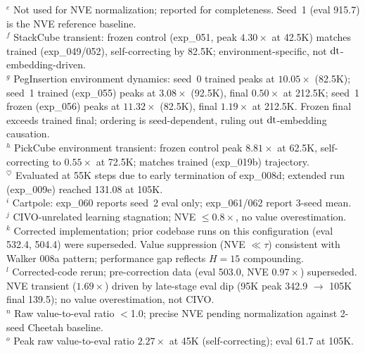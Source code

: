 \begin{table}[t]
{$^e$ Not used for NVE normalization; reported for completeness. Seed~1 (eval 915.7) is the NVE reference baseline.\\
$^f$ StackCube transient: frozen control (exp\_051, peak $4.30\times$ at 42.5K) matches trained (exp\_049/052), self-correcting by 82.5K; environment-specific, not $\mathrm{dt}$-embedding-driven.\\
$^g$ PegInsertion environment dynamics: seed~0 trained peaks at $10.05\times$ (82.5K); seed~1 trained (exp\_055) peaks at $3.08\times$ (92.5K), final $0.50\times$ at 212.5K; seed~1 frozen (exp\_056) peaks at $11.32\times$ (82.5K), final $1.19\times$ at 212.5K. Frozen final exceeds trained final; ordering is seed-dependent, ruling out $\mathrm{dt}$-embedding causation.\\
$^h$ PickCube environment transient: frozen control peak $8.81\times$ at 62.5K, self-correcting to $0.55\times$ at 72.5K; matches trained (exp\_019b) trajectory.\\
$^\heartsuit$ Evaluated at 55K steps due to early termination of exp\_008d; extended run (exp\_009e) reached 131.08 at 105K.\\
$^i$ Cartpole: exp\_060 reports seed~2 eval only; exp\_061/062 report 3-seed mean.\\
$^j$ CIVO-unrelated learning stagnation; NVE $\leq 0.8\times$, no value overestimation.\\
$^k$ Corrected implementation; prior codebase runs on this configuration (eval 532.4, 504.4) were superseded. Value suppression (NVE $\ll \tau$) consistent with Walker 008a pattern; performance gap reflects $H{=}15$ compounding.\\
$^l$ Corrected-code rerun; pre-correction data (eval 503.0, NVE $0.97\times$) superseded. NVE transient ($1.69\times$) driven by late-stage eval dip (95K peak 342.9 $\to$ 105K final 139.5); no value overestimation, not CIVO.\\
$^n$ Raw value-to-eval ratio $<$1.0; precise NVE pending normalization against 2-seed Cheetah baseline.\\
$^o$ Peak raw value-to-eval ratio $2.27\times$ at 45K (self-correcting); eval 61.7 at 105K.\par}
\end{table}

